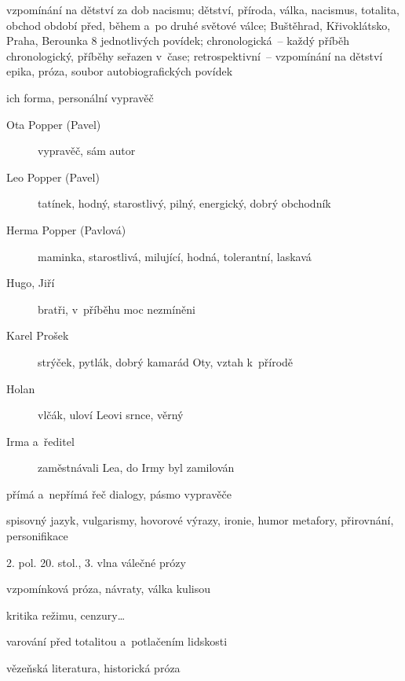 {
vzpomínání na dětství za dob nacismu; dětství, příroda, válka, nacismus, totalita, obchod
období před, během a~po druhé světové válce; Buštěhrad, Křivoklátsko, Praha, Berounka
8 jednotlivých povídek; chronologická~-- každý příběh chronologický, příběhy
seřazen v~čase; retrospektivní~-- vzpomínání na dětství
epika, próza, soubor autobiografických povídek

\newpart

ich forma, personální vypravěč
\begin{description}
\item[Ota Popper (Pavel)] vypravěč, sám autor
\item[Leo Popper (Pavel)] tatínek, hodný, starostlivý, pilný, energický, dobrý obchodník
\item[Herma Popper (Pavlová)] maminka, starostlivá, milující, hodná, tolerantní, laskavá
\item[Hugo, Jiří] bratři, v~příběhu moc nezmíněni
\item[Karel Prošek] strýček, pytlák, dobrý kamarád Oty, vztah k~přírodě
\item[Holan] vlčák, uloví Leovi srnce, věrný
\item[Irma a~ředitel] zaměstnávali Lea, do Irmy byl zamilován 
\end{description}

přímá a~nepřímá řeč
dialogy, pásmo vypravěče

\newpart

spisovný jazyk, vulgarismy, hovorové výrazy, ironie, humor
metafory, přirovnání, personifikace

\begin{compactitem}
	\item 2. pol. 20. stol., 3. vlna válečné prózy
	\item vzpomínková próza, návraty, válka kulisou
	\item kritika režimu, cenzury\dots
	\item varování před totalitou a~potlačením lidskosti
	\item vězeňská literatura, historická próza
\end{compactitem}

}
